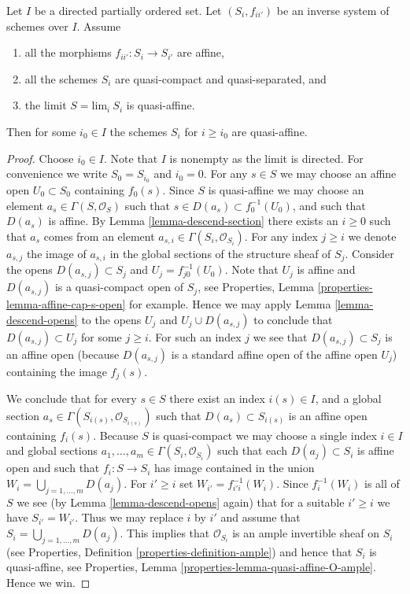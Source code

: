 \begin{lemma}
\label{lemma-limit-quasi-affine}
Let $I$ be a directed partially ordered set.
Let $(S_i, f_{ii'})$ be an inverse system of
schemes over $I$. Assume
\begin{enumerate}
\item all the morphisms $f_{ii'} : S_i \to S_{i'}$ are affine,
\item all the schemes $S_i$ are quasi-compact and quasi-separated, and
\item the limit $S = \text{lim}_i\ S_i$ is quasi-affine.
\end{enumerate}
Then for some $i_0 \in I$ the schemes $S_i$ for $i \geq i_0$
are quasi-affine.
\end{lemma}

\begin{proof}
Choose $i_0 \in I$. Note that $I$ is nonempty as the limit is directed.
For convenience we write $S_0 = S_{i_0}$ and $i_0 = 0$.
For any $s \in S$ we may choose an affine open
$U_0 \subset S_0$ containing $f_0(s)$. Since $S$ is quasi-affine
we may choose an element $a_s \in \Gamma(S, \mathcal{O}_S)$ such
that $s \in D(a_s) \subset f_0^{-1}(U_0)$, and such that
$D(a_s)$ is affine. By Lemma \ref{lemma-descend-section}
there exists an $i \geq 0$ such that $a_s$
comes from an element $a_{s, i} \in \Gamma(S_i, \mathcal{O}_{S_i})$.
For any index $j \geq i$ we denote $a_{s, j}$
the image of $a_{s, i}$ in the global sections of the
structure sheaf of $S_j$.
Consider the opens $D(a_{s, j}) \subset S_j$
and $U_j = f_{j0}^{-1}(U_0)$. Note that
$U_j$ is affine and $D(a_{s, j})$ is a quasi-compact open of $S_j$,
see Properties, Lemma \ref{properties-lemma-affine-cap-s-open}
for example. Hence we may apply Lemma \ref{lemma-descend-opens} to the opens
$U_j$ and $U_j \cup D(a_{s, j})$ to conclude that
$D(a_{s, j}) \subset U_j$ for some  $j \geq i$.
For such an index $j$ we see that $D(a_{s, j}) \subset S_j$ is an affine open
(because $D(a_{s, j})$ is a standard affine open of the affine open $U_j$)
containing the image $f_j(s)$.

\medskip\noindent
We conclude that for every $s \in S$ there exist
an index $i(s) \in I$, and a global section
$a_s \in \Gamma(S_{i(s)}, \mathcal{O}_{S_{i(s)}})$
such that $D(a_s) \subset S_{i(s)}$ is an affine open
containing $f_i(s)$. Because $S$ is quasi-compact we
may choose a single index $i \in I$ and global sections
$a_1, \ldots, a_m \in \Gamma(S_i, \mathcal{O}_{S_i})$
such that each $D(a_j) \subset S_i$ is affine open
and such that $f_i : S \to S_i$ has image contained
in the union $W_i = \bigcup_{j = 1, \ldots, m} D(a_j)$.
For $i' \geq i$ set $W_{i'} = f_{i'i}^{-1}(W_i)$.
Since $f_i^{-1}(W_i)$ is all of $S$ we see
(by Lemma \ref{lemma-descend-opens} again)
that for a suitable $i' \geq i$ we
have $S_{i'} = W_{i'}$. Thus we may replace $i$ by
$i'$ and assume that $S_i = \bigcup_{j = 1, \ldots, m} D(a_j)$.
This implies that $\mathcal{O}_{S_i}$ is an ample invertible
sheaf on $S_i$ (see Properties, Definition \ref{properties-definition-ample})
and hence that $S_i$ is quasi-affine, see
Properties, Lemma \ref{properties-lemma-quasi-affine-O-ample}.
Hence we win.
\end{proof}

